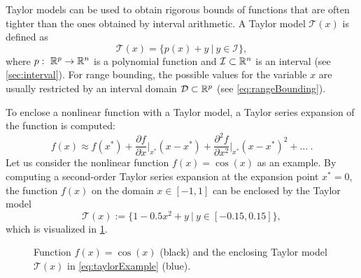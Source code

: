  \label{sec:taylorModels}

Taylor models \cite{Berz1998, Makino1996, Makino2003, Makino2009} can be used to obtain rigorous bounds of functions that are often tighter than the ones obtained by interval arithmetic. A Taylor model $\mathcal{T}(x)$ is defined as
\begin{equation}
	\mathcal{T}(x) = \{ p(x) + y~|~ y \in \mathcal{I} \},
\end{equation}
where $p:~\mathbb{R}^p \to \mathbb{R}^n$ is a polynomial function and $\mathcal{I} \subset \mathbb{R}^n$ is an interval (see \cref{sec:interval}). For range bounding, the possible values for the variable $x$ are usually restricted by an interval domain $\mathcal{D} \subset \mathbb{R}^p$ (see \eqref{eq:rangeBounding}).

To enclose a nonlinear function with a Taylor model, a Taylor series expansion of the function is computed:
\begin{equation*}
	f(x) \approx f(x^*) + \frac{\partial f}{\partial x} \bigg|_{x^*} (x - x^*) + \frac{\partial^2 f}{\partial x^2} \bigg|_{x^*} (x - x^*)^2 + \dots\ .
\end{equation*}
Let us consider the nonlinear function $f(x) = \cos(x)$ as an example. By computing a second-order Taylor series expansion at the expansion point $x^* = 0$, the function $f(x)$ on the domain $x \in [-1,1]$ can be enclosed by the Taylor model
\begin{equation}
		\mathcal{T}(x) := \big \{ 1 - 0.5 x^2 + y~\big|~ y \in [-0.15,0.15] \big \},
		\label{eq:taylorExample}
\end{equation}
which is visualized in \cref{fig:taylorExample}.

\begin{figure}[h]	
	\centering
	\caption{Function $f(x) = \cos(x)$ (black) and the enclosing Taylor model $\mathcal{T}(x)$ in \eqref{eq:taylorExample} (blue).}
	\label{fig:taylorExample}
\end{figure}

